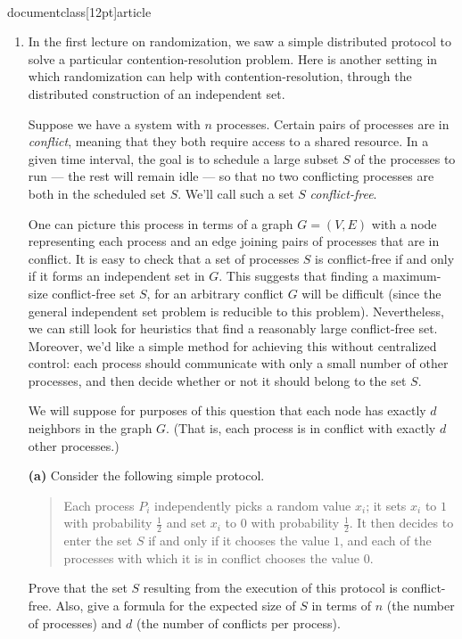 \\documentclass[12pt]{article}
\begin{document}
\begin{enumerate}




\item 

In the first lecture on randomization, we saw a simple
distributed protocol to solve a particular contention-resolution problem.
Here is another setting in which randomization
can help with contention-resolution, through the distributed
construction of an independent set.

Suppose we have a system with $n$ processes.
Certain pairs of processes are in {\em conflict},
meaning that they both require access to a shared resource.
In a given time interval, the goal is to schedule
a large subset $S$ of the processes to run --- the rest
will remain idle --- so that no two conflicting
processes are both in the scheduled set $S$.
We'll call such a set $S$ {\em conflict-free}.

One can picture this process in terms of a
graph $G = (V,E)$ with a node representing each process
and an edge joining pairs of processes that are in conflict.
It is easy to check that a set of processes $S$ is conflict-free
if and only if it forms an independent set in $G$.
This suggests that finding a maximum-size conflict-free set $S$,
for an arbitrary conflict $G$ will be difficult
(since the general independent set problem is reducible to
this problem).
Nevertheless, we can still look for heuristics
that find a reasonably large conflict-free set.
Moreover, we'd like a simple method for achieving this
without centralized control:
each process should communicate with only a small
number of other processes, and then decide whether or
not it should belong to the set $S$.

We will suppose for purposes of this question that each node
has exactly $d$ neighbors in the graph $G$.
(That is, each process is in conflict with exactly $d$
other processes.)

\medskip
{\bf (a)} Consider the following simple protocol.
\begin{quote}
Each process $P_i$ independently picks a random value $x_i$;
it sets $x_i$ to $1$ with probability $\frac12$
and set $x_i$ to $0$ with probability $\frac12$.
It then decides to enter the set $S$ if and only if
it chooses the value $1$, and each of the processes with
which it is in conflict chooses the value $0$.
\end{quote}
Prove that the set $S$ resulting from the
execution of this protocol is conflict-free.
Also, give a formula for the expected size of $S$
in terms of $n$ (the number of processes)
and $d$ (the number of conflicts per process).


\end{enumerate}
\end{document}
